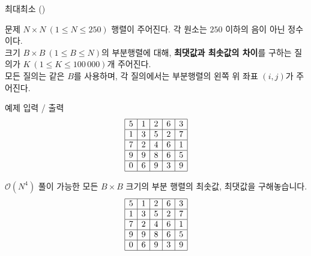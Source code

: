 
\begin{frame}[label=p1]{최대최소 (\prob)}
\small
\begin{block}{문제}
$N \times N\ (1 \le N \le 250)$ 행렬이 주어진다. 각 원소는 $250$ 이하의 음이 아닌 정수이다. \\

크기 $B \times B\ (1 \le B \le N)$의 부분행렬에 대해,
\textbf{최댓값과 최솟값의 차이}를 구하는 질의가
$K\ (1 \le K \le 100\,000)$개 주어진다. \\

모든 질의는 같은 $B$를 사용하며, 각 질의에서는 부분행렬의 왼쪽 위 좌표 $(i,j)$가 주어진다.
\end{block}
\end{frame}


\begin{frame}{예제 입력 / 출력}
\huge
\[
\begin{array}{|c|c|c|c|c|}
\hline
5 & 1 & 2 & 6 & 3 \\ \hline
1 & 3 & 5 & 2 & 7 \\ \hline
7 & 2 & 4 & 6 & 1 \\ \hline
9 & 9 & 8 & 6 & 5 \\ \hline
0 & 6 & 9 & 3 & 9 \\ \hline
\end{array}
\]
\end{frame}

\begin{frame}{$\mathcal{O}(N^4)$ 풀이}
가능한 모든 $B \times B$ 크기의 부분 행렬의 최솟값, 최댓값을 구해놓습니다.
\[
\begin{array}{|c|c|c|c|c|}
\hline
5 & 1 & 2 & 6 & 3 \\ \hline
1 & 3 & 5 & 2 & 7 \\ \hline
7 & 2 & 4 & 6 & 1 \\ \hline
9 & 9 & 8 & 6 & 5 \\ \hline
0 & 6 & 9 & 3 & 9 \\ \hline
\end{array}
\]
\end{frame}

